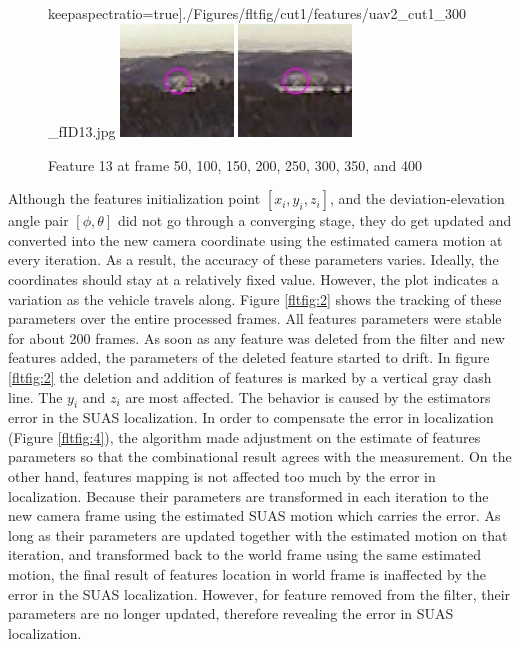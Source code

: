 \begin{figure}[h]
keepaspectratio=true]{./Figures/fltfig/cut1/features/uav2_cut1_300_fID13.jpg}
\includegraphics[width=3cm,
keepaspectratio=true]{./Figures/fltfig/cut1/features/uav2_cut1_350_fID13.jpg}
\includegraphics[width=3cm,
keepaspectratio=true]{./Figures/fltfig/cut1/features/uav2_cut1_397_fID13.jpg}
\caption{Feature 13 at frame 50, 100, 150, 200, 250, 300, 350, and 400}
\label{fltfig:1_1}
\end{figure}

Although the features initialization point $[x_i, y_i, z_i]$, and the
deviation-elevation angle pair $[\phi, \theta]$ did not go through a
converging stage, they do get updated and converted into the new
camera coordinate using the estimated camera motion at every
iteration. As a result, the accuracy of these parameters varies.
Ideally, the coordinates should stay at a relatively fixed value.
However, the plot indicates a variation as the vehicle travels along.
Figure \ref{fltfig:2} shows the tracking of these parameters over the
entire processed frames. All features parameters were stable for about
200 frames. As soon as any feature was deleted from the filter and new
features added, the parameters of the deleted feature started to
drift. In figure \ref{fltfig:2} the deletion and addition of features is
marked by a vertical gray dash line. The $y_i$ and $z_i$ are most
affected. The behavior is caused by the estimators error in the SUAS
localization. In order to compensate the error in localization (Figure
\ref{fltfig:4}), the algorithm made adjustment on the estimate of
features parameters so that the combinational result agrees with the
measurement. On the other hand, features mapping is not affected too
much by the error in localization. Because their parameters are
transformed in each iteration to the new camera frame using the
estimated SUAS motion which carries the error. As long as their
parameters are updated together with the estimated motion on that
iteration, and transformed back to the world frame using the same
estimated motion, the final result of features location in world frame
is inaffected by the error in the SUAS localization. However, for
feature removed from the filter, their parameters are no longer
updated, therefore revealing the error in SUAS localization.

